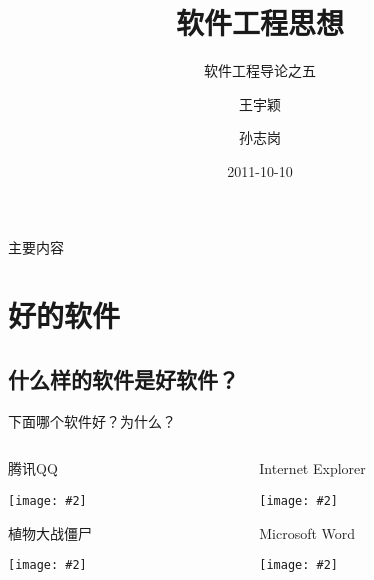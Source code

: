 \documentclass[CJK]{beamer}
\title[Thinking in SE]
{软件工程思想}
\subtitle
{软件工程导论之五} %
\author[\url{http://sunner.cn}] %
{王宇颖 \and 孙志岗}
\institute[哈尔滨工业大学] %
{
  计算机科学与技术学院\\
  哈尔滨工业大学}
\date[Short Occasion] %
{2011-10-10}
\begin{document}
\begin{frame}
  \titlepage
\end{frame}

\begin{frame}{主要内容}
  \tableofcontents
\end{frame}




\section{好的软件}

\subsection{什么样的软件是好软件？}

\newenvironment{iconblock}[2]{
    \begin{block}{#1}
    \begin{center}
    \texttt{[image: \#2]}}
{\end{center}
    \end{block}
}

\begin{frame}{下面哪个软件好？为什么？}
  \begin{columns}[T]
    \begin{column}{4cm}
      \begin{iconblock}{腾讯QQ}{qq.jpg}\end{iconblock}
      \begin{iconblock}{植物大战僵尸}{pvz.jpg}\end{iconblock}
    \end{column}
    \begin{column}{4cm}
      \begin{iconblock}{Internet Explorer}{ie.png}\end{iconblock}
      \begin{iconblock}{Microsoft Word}{word.png}\end{iconblock}
    \end{column}
  \end{columns}

\end{frame}
\end{document}
